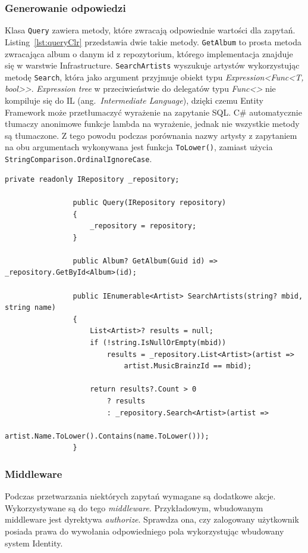 		\subsubsection*{Generowanie odpowiedzi}
			Klasa \verb|Query| zawiera metody, które zwracają odpowiednie wartości dla zapytań.
			Listing~\ref{lst:queryClr} przedstawia dwie takie metody.
			\verb|GetAlbum| to prosta metoda zwracająca album o danym id z repozytorium, którego implementacja znajduje się w warstwie Infrastructure.
			\verb|SearchArtists| wyszukuje artystów wykorzystując metodę \verb|Search|, która jako argument przyjmuje obiekt typu \emph{Expression<Func<T, bool>>}.
			\emph{Expression tree} w przeciwieństwie do delegatów typu \emph{Func<>} nie kompiluje się do IL (ang.\ \emph{Intermediate Language}),
			dzięki czemu Entity Framework może przetłumaczyć wyrażenie na zapytanie SQL.
			C\# automatycznie tłumaczy anonimowe funkcje lambda na wyrażenie, jednak nie wszystkie metody są tłumaczone.
			Z tego powodu podczas porównania nazwy artysty z zapytaniem na obu argumentach wykonywana jest funkcja \verb|ToLower()|,
			zamiast użycia \verb|StringComparison.OrdinalIgnoreCase|.

			\begin{lstlisting}[label=lst:queryClr, caption=Fragment klasy Query, float]
				private readonly IRepository _repository;
		
				public Query(IRepository repository)
				{
					_repository = repository;
				}

				public Album? GetAlbum(Guid id) => _repository.GetById<Album>(id);

				public IEnumerable<Artist> SearchArtists(string? mbid, string name)
				{
					List<Artist>? results = null;
					if (!string.IsNullOrEmpty(mbid))
						results = _repository.List<Artist>(artist =>
							artist.MusicBrainzId == mbid);
		
					return results?.Count > 0
						? results
						: _repository.Search<Artist>(artist =>
							artist.Name.ToLower().Contains(name.ToLower()));
				}
			\end{lstlisting}

		\subsubsection*{Middleware}
			Podczas przetwarzania niektórych zapytań wymagane są dodatkowe akcje.
			Wykorzystywane są do tego \emph{middleware}.
			Przykładowym, wbudowanym middleware jest dyrektywa \emph{authorize}.
			Sprawdza ona, czy zalogowany użytkownik posiada prawa do wywołania odpowiedniego pola wykorzystując wbudowany system Identity.
			
